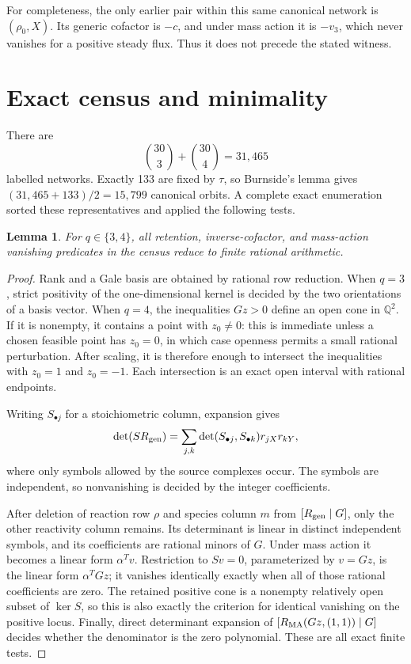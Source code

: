 \documentclass[11pt]{article}
\newtheorem{lemma}{Lemma}
\newcommand{\Q}{\mathbb{Q}}
\begin{document}
For completeness, the only earlier pair within this same canonical network is
\((\rho_0,X)\).  Its generic cofactor is \(-c\), and under mass action it is
\(-v_3\), which never vanishes for a positive steady flux.  Thus it does not
precede the stated witness.

\section{Exact census and minimality}

There are
\[
 \binom{30}{3}+\binom{30}{4}=31{,}465
\]
labelled networks.  Exactly 133 are fixed by \(\tau\), so Burnside's lemma
gives \((31{,}465+133)/2=15{,}799\) canonical orbits.  A complete exact
enumeration sorted these representatives and applied the following tests.

\begin{lemma}\label{lem:tests}
For \(q\in\{3,4\}\), all retention, inverse-cofactor, and mass-action
vanishing predicates in the census reduce to finite rational arithmetic.
\end{lemma}

\begin{proof}
Rank and a Gale basis are obtained by rational row reduction.  When
\(q=3\), strict positivity of the one-dimensional kernel is decided by the
two orientations of a basis vector.  When \(q=4\), the inequalities
\(Gz>0\) define an open cone in \(\Q^2\).  If it is nonempty, it contains a
point with \(z_0\ne0\): this is immediate unless a chosen feasible point has
\(z_0=0\), in which case openness permits a small rational perturbation.
After scaling, it is therefore enough to intersect the inequalities with
\(z_0=1\) and \(z_0=-1\).  Each intersection is an exact open interval with
rational endpoints.

Writing \(S_{\bullet j}\) for a stoichiometric column, expansion gives
\[
 \det(SR_{\rm gen})=
 \sum_{j,k}\det(S_{\bullet j},S_{\bullet k})
 r_{jX}r_{kY},
\]
where only symbols allowed by the source complexes occur.  The symbols are
independent, so nonvanishing is decided by the integer coefficients.

After deletion of reaction row \(\rho\) and species column \(m\) from
\([R_{\rm gen}\mid G]\), only the other reactivity column remains.  Its
determinant is linear in distinct independent symbols, and its coefficients
are rational minors of \(G\).  Under mass action it becomes a linear form
\(\alpha^Tv\).  Restriction to \(Sv=0\), parameterized by \(v=Gz\), is the
linear form \(\alpha^TGz\); it vanishes identically exactly when all of those
rational coefficients are zero.  The retained positive cone is a nonempty
relatively open subset of \(\ker S\), so this is also exactly the criterion
for identical vanishing on the positive locus.  Finally, direct determinant expansion of
\([R_{\rm MA}(Gz,(1,1))\mid G]\) decides whether the denominator is the zero
polynomial.  These are all exact finite tests.
\end{proof}
\end{document}
